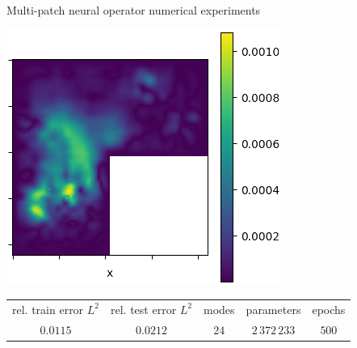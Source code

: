 \documentclass{beamer}
\begin{document}
\begin{frame}{Multi-patch neural operator numerical experiments}
\begin{center}
\begin{minipage}{0.24\textwidth}
        \end{minipage}
        \hfill
        \begin{minipage}{0.24\textwidth}
            \includegraphics[width=\textwidth]{MPNO_error.png}
        \end{minipage}
    \end{center}
	\begin{table}[h!] %
		\centering
		\begin{tabular}{ccccc}\toprule
		rel. train error $ L^2 $ & rel. test error $L^2$ & modes & parameters & epochs \\
			\cmidrule{1-5}
			$ 0.0115 $ & $0.0212$ & $24$ &$ 2\, 372\, 233 $ & $500$ \\
			\bottomrule
		\end{tabular}
	\end{table}
\end{frame}

\end{document}
